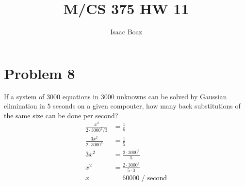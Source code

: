 \documentclass{article}
\title{\vspace{-5ex}M/CS 375 HW 11}
\author{Isaac Boaz}
\begin{document}
\maketitle

\section*{Problem 8}
If a system of 3000 equations in 3000 unknowns can be solved by Gaussian elimination in 5 seconds on a given compouter, how many back substitutions of the same size can be done per second?
\begin{align*}
    \frac{x^2}{2\cdot3000^3/3} & = \frac{1}{5} \\
    \frac{3x^2}{2\cdot3000^3} & = \frac{1}{5} \\
    3x^2 & = \frac{2\cdot3000^3}{5} \\
    x^2 & = \frac{2\cdot3000^3}{5\cdot3} \\
    x & = 60000 \text{ / second}
\end{align*}
\end{document}
